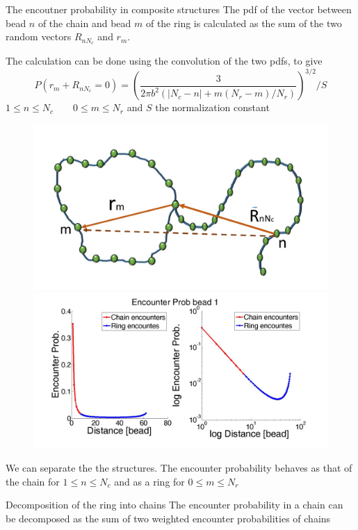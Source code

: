 \documentclass[8pt]{beamer}
\begin{document}
\begin{frame}{The encoutner probability in composite structures}
The pdf of the vector between bead $n$ of the chain and bead $m$ of the ring is calculated as the sum of the two random vectors $R_{nN_c}$ and $r_m$. 

The calculation can be done using the convolution of the two pdfs, to give
\begin{equation*}
P(r_m+R_{nN_c}=0)=\left(\frac{3}{2\pi b^2(|N_c-n|+m(N_r-m)/N_r)}\right)^{3/2}/S
\end{equation*}
$1\leq n \leq N_c \qquad 0\leq m \leq N_r$ and $S$ the normalization constant 
\begin{figure}
\includegraphics[scale=0.13]{rouseChainAndRingVectorBetweenBeads}
\includegraphics[scale=0.09]{chainRingEncounterTheoreticalProb}
\end{figure}
We can separate the the structures. 
The encounter probability behaves as that of the chain for $1\leq n \leq N_c$ and as a ring for $0\leq m \leq N_r$
\end{frame}

\begin{frame}{Decomposition of the ring into chains}
The encounter probability in a chain can be decomposed as the sum of two weighted encounter probabilities of chains
\end{frame}
\end{document}
